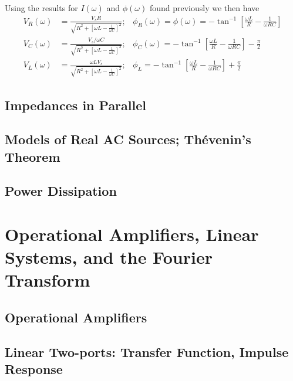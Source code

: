\documentclass[12pt, a4paper, oneside, openright, titlepage]{book}
\begin{document}
Using the results for $I(\omega)$ and $\phi(\omega)$ found previously we then have \begin{align*}
    V_R(\omega) &= \frac{V_sR}{\sqrt{R^2+\left[\omega L-\frac{1}{\omega C}\right]^2}};\;\;\;\phi_R(\omega) = \phi(\omega) = -\tan^{-1}\left[\frac{\omega L}{R} - \frac{1}{\omega RC}\right] \\
    V_C(\omega) &= \frac{V_s/\omega C}{\sqrt{R^2+\left[\omega L-\frac{1}{\omega C}\right]^2}};\;\;\;\phi_C(\omega) = -\tan^{-1}\left[\frac{\omega L}{R} - \frac{1}{\omega RC}\right] - \frac{\pi}{2} \\
    V_L(\omega) &= \frac{\omega LV_s}{\sqrt{R^2+\left[\omega L-\frac{1}{\omega C}\right]^2}};\;\;\;\phi_L = -\tan^{-1}\left[\frac{\omega L}{R} - \frac{1}{\omega RC}\right] + \frac{\pi}{2}
\end{align*}





\chapter{Impedances in Parallel}


\chapter{Models of Real AC Sources; Th\'{e}venin's Theorem}


\chapter{Power Dissipation}



\part{Operational Amplifiers, Linear Systems, and the Fourier Transform}


\chapter{Operational Amplifiers}



\chapter{Linear Two-ports: Transfer Function, Impulse Response}
\end{document}
